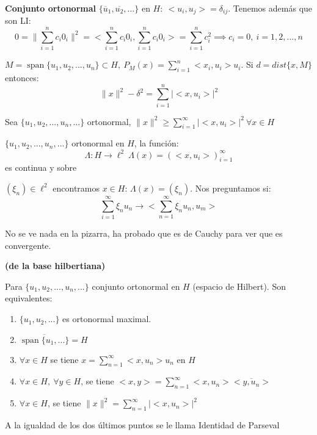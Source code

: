 \documentclass[openany]{book}
\begin{document}
    \begin{definition}
        
        \textbf{Conjunto ortonormal} $ \{\overline{u}_1,\overline{u_2},...\} $ en $ H:\ <u_i,u_j> = \delta_{ij} $. Tenemos además que son LI:
        $$ 0 = \|\sum\limits_{i=1}^{n}c_i 0_{i}\|^2 = <\sum\limits_{i=1}^{n}c_i 0_{i},\sum\limits_{i=1}^{n}c_i 0_{i}> = \sum\limits_{i=1}^{n}c_i^2 \implies c_i = 0,\ i=1,2,...,n$$
    \end{definition}

    \begin{proposition}
        $ M = \operatorname{span} \{u_1,u_2,...,u_n\} \subset H,\ P_{M}(x) = \sum\limits_{i=1}^{n}<x_i,u_i>u_i$. Si $ d = dist \{x,M\} $ entonces:
        $$ \|x\|^2 - \delta ^2 = \sum\limits_{i=1}^{n}|<x,u_i>|^2 $$
    \end{proposition}

    \begin{lemma}
        Sea $ \{u_1,u_2,...,u_n,...\} $ ortonormal, $ \|x\|^2 \geq \sum\limits_{i=1}^{\infty} |<x,u_i>|^2\ \forall x \in H$
    \end{lemma}
\newpage
\begin{proposition}
    $ \{u_1,u_2,...,u_n,...\} $ ortonormal en $ H $, la función:
    $$ \Lambda: H \to \ell^2\ \Lambda(x) = \left( <x,u_i>   \right)_{i=1}^{\infty} $$
    es continua y sobre
\end{proposition}

\begin{demonstration}
    $ (\xi_n) \in \ell ^2 $ encontramos $ x \in H $: $ \Lambda(x) = (\xi_n) $. Nos preguntamos si:
    $$ \sum\limits_{i=1}^{\infty} \xi_nu_n \to <\sum\limits_{n=1}^{\infty}\xi_nu_n,u_m> $$

    No se ve nada en la pizarra, ha probado que es de Cauchy para ver que es convergente.

\end{demonstration}



\begin{theorem}
    \textbf{(de la base hilbertiana)}

    Para $ \{u_1,u_2,...,u_n,...\} $ conjunto ortonormal en $ H $ (espacio de Hilbert). Son equivalentes:
    \begin{enumerate}
        \item $ \{u_1,u_2,...\} $ es ortonormal maximal.\vspace{3mm}
        \item $ \overline{\operatorname{span} \{u_1,...\}} = H $
        \item $ \forall x \in H $ se tiene $ x = \sum\limits_{n=1}^{\infty}<x,u_n>u_n $ en $ H $
        \item $ \forall x \in H,\ \forall y \in H $, se tiene $ <x,y> = \sum\limits_{n=1}^{\infty}<x,u_n>\overline{<y,u_n>} $
        \item $ \forall x \in H $, se tiene $ \|x\|^2 = \sum\limits_{n=1}^{\infty}|<x,u_n>|^2 $

    \end{enumerate}
    A la igualdad de los dos últimos puntos se le llama Identidad de Parseval
\end{theorem}
\end{document}
